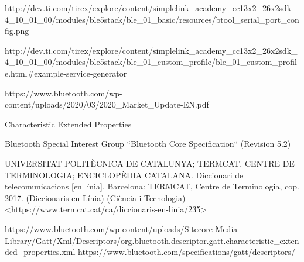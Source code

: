 \begin{thebibliography}{2}
http://dev.ti.com/tirex/explore/content/simplelink\_academy\_cc13x2\_26x2sdk\_4\_10\_01\_00/modules/ble5stack/ble\_01\_basic/resources/btool\_serial\_port\_config.png

http://dev.ti.com/tirex/explore/content/simplelink\_academy\_cc13x2\_26x2sdk\_4\_10\_01\_00/modules/ble5stack/ble\_01\_custom\_profile/ble\_01\_custom\_profile.html\#example-service-generator

https://www.bluetooth.com/wp-content/uploads/2020/03/2020\_Market\_Update-EN.pdf

Characteristic Extended Properties

Bluetooth Special Interest Group
``Bluetooth Core Specification``
(Revision 5.2)

UNIVERSITAT POLITÈCNICA DE CATALUNYA; TERMCAT, CENTRE DE TERMINOLOGIA; ENCICLOPÈDIA CATALANA. Diccionari de telecomunicacions [en línia]. Barcelona: TERMCAT, Centre de Terminologia, cop. 2017. (Diccionaris en Línia) (Ciència i Tecnologia)
<https://www.termcat.cat/ca/diccionaris-en-linia/235>

https://www.bluetooth.com/wp-content/uploads/Sitecore-Media-Library/Gatt/Xml/Descriptors/org.bluetooth.descriptor.gatt.characteristic\_extended\_properties.xml
https://www.bluetooth.com/specifications/gatt/descriptors/

\end{thebibliography}